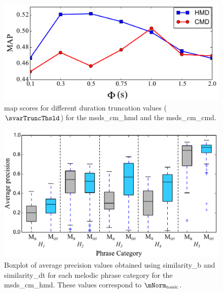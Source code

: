 \begin{figure}
	\begin{center}
		\includegraphics[width=\figSizeEightyFive]{ch06_patterns/figures/ImprovingSimilarity/MAP_per_Duration_Truncation.pdf}
	\end{center}
	\caption[\acrshort{map} score for different duration truncation values]{\gls{map} scores for different duration truncation values ($\svarTruncThsld$) for the \acrshort{msds_cm_hmd} and the \acrshort{msds_cm_cmd}.} 
	\label{fig:map_per_duration_truncation}
\end{figure}

\begin{figure}
	\begin{center}
		\includegraphics[width=\figSizeEightyFive]{ch06_patterns/figures/ImprovingSimilarity/HindustaniPerCategoryPerformance_BOXPLOT.pdf}
	\end{center}
	\caption[Boxplot of average precision for different types of melodic patterns in the Hindustani music dataset]{Boxplot of average precision values obtained using \acrshort{similarity_b} and \acrshort{similarity_dt} for each melodic phrase category for the \acrshort{msds_cm_hmd}. These values correspond to $\mNorm_\mathrm{tonic}$.} 
	\label{fig:hinudstaniPerCategoryPerformance}
\end{figure}


